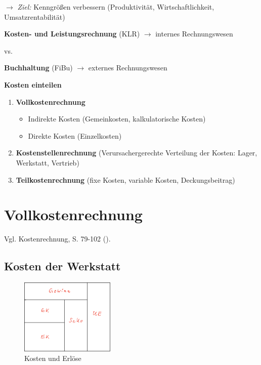$\to$ \emph{Ziel:} Kenngrößen verbessern (Produktivität,
Wirtschaftlichkeit, Umsatzrentabilität)

\textbf{Kosten- und Leistungsrechnung} (KLR) $\to$ internes
Rechnungswesen

vs.

\textbf{Buchhaltung} (FiBu) $\to$ externes Rechnungswesen

\textbf{Kosten einteilen}

\begin{enumerate}
\item
  \textbf{Vollkostenrechnung}

  \begin{itemize}
  \item
    Indirekte Kosten (Gemeinkosten, kalkulatorische Kosten)
  \item
    Direkte Kosten (Einzelkosten)
  \end{itemize}
\item
  \textbf{Kostenstellenrechnung} (Verursachergerechte Verteilung der
  Kosten: Lager, Werkstatt, Vertrieb)
\item
  \textbf{Teilkostenrechnung} (fixe Kosten, variable Kosten,
  Deckungsbeitrag)
\end{enumerate}

\section{Vollkostenrechnung}\label{vollkostenrechnung}

Vgl. Kostenrechnung, S. 79-102 (\textcite{heiser:2017:betriebsfuhrung}).

\subsection{Kosten der Werkstatt}\label{kosten-der-werkstatt}

\begin{figure}[!ht]%
\centering
\includegraphics[width=0.4\textwidth]{images/Skizze/02_Umsatzerloese_Skizze.pdf}
\caption{Kosten und Erlöse}
\end{figure}

